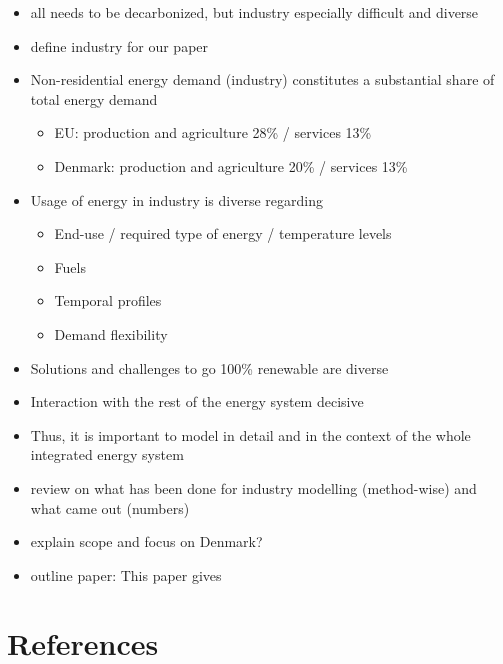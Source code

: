 \documentclass[review]{elsarticle}
\begin{document}
\begin{itemize}
    \item all needs to be decarbonized, but industry especially difficult and diverse
    \item define industry for our paper
    \item Non-residential energy demand (industry) constitutes a
substantial share of total energy demand
    \begin{itemize}
        \item EU: production and agriculture 28\% / services 13\% \cite{Eurostat2017}
        \item Denmark: production and agriculture 20\% / services 13\% \cite{DanishEnergyAgency2014}
    \end{itemize}
    \item Usage of energy in industry is diverse regarding
        \begin{itemize}
            \item End-use / required type of energy / temperature levels
            \item Fuels
            \item Temporal profiles
            \item Demand flexibility
        \end{itemize}
    \item Solutions and challenges to go 100\% renewable are diverse
    \item Interaction with the rest of the energy system decisive
    \item Thus, it is important to model in detail and in the context of the whole integrated energy system
    \item review on what has been done for industry modelling (method-wise) and what came out (numbers)
    \item explain scope and focus on Denmark?
    \item outline paper: This paper gives 
\end{itemize}







\section*{References}



\end{document}
